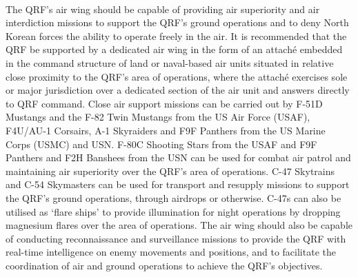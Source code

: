 \documentclass[a4paper,12pt]{article}
\begin{document}
{	\\
	The QRF's air wing should be capable of providing air superiority and air interdiction missions to support the QRF's ground operations and to deny North Korean forces the ability to operate freely in the air. It is recommended that the QRF be supported by a dedicated air wing in the form of an attaché embedded in the command structure of land or naval-based air units situated in relative close proximity to the QRF's area of operations, where the attaché exercises sole or major jurisdiction over a dedicated section of the air unit and answers directly to QRF command. Close air support missions can be carried out by F-51D Mustangs and the F-82 Twin Mustangs from the US Air Force (USAF), F4U/AU-1 Corsairs, A-1 Skyraiders and F9F Panthers from the US Marine Corps (USMC) and USN. F-80C Shooting Stars from the USAF and F9F Panthers and F2H Banshees from the USN can be used for combat air patrol and maintaining air superiority over the QRF's area of operations. C-47 Skytrains and C-54 Skymasters can be used for transport and resupply missions to support the QRF's ground operations, through airdrops or otherwise. C-47s can also be utilised as `flare ships' to provide illumination for night operations by dropping magnesium flares over the area of operations. The air wing should also be capable of conducting reconnaissance and surveillance missions to provide the QRF with real-time intelligence on enemy movements and positions, and to facilitate the coordination of air and ground operations to achieve the QRF's objectives.
}

\clearpage

\printbibliography
\end{document}
